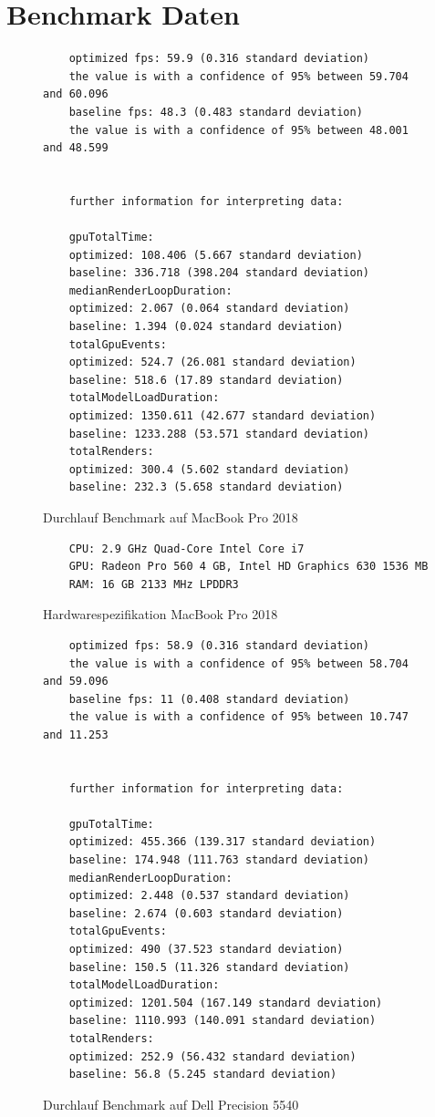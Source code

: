 \section{Benchmark Daten}
\begin{figure}[H]
  \begin{lstlisting}
    optimized fps: 59.9 (0.316 standard deviation)
    the value is with a confidence of 95% between 59.704 and 60.096
    baseline fps: 48.3 (0.483 standard deviation)
    the value is with a confidence of 95% between 48.001 and 48.599


    further information for interpreting data:

    gpuTotalTime:
    optimized: 108.406 (5.667 standard deviation)
    baseline: 336.718 (398.204 standard deviation)
    medianRenderLoopDuration:
    optimized: 2.067 (0.064 standard deviation)
    baseline: 1.394 (0.024 standard deviation)
    totalGpuEvents:
    optimized: 524.7 (26.081 standard deviation)
    baseline: 518.6 (17.89 standard deviation)
    totalModelLoadDuration:
    optimized: 1350.611 (42.677 standard deviation)
    baseline: 1233.288 (53.571 standard deviation)
    totalRenders:
    optimized: 300.4 (5.602 standard deviation)
    baseline: 232.3 (5.658 standard deviation)
  \end{lstlisting}
\caption{Durchlauf Benchmark auf MacBook Pro 2018}
\label{fig:benchmarkRun}
\end{figure}

\begin{figure}[H]
  \begin{lstlisting}
    CPU: 2.9 GHz Quad-Core Intel Core i7
    GPU: Radeon Pro 560 4 GB, Intel HD Graphics 630 1536 MB
    RAM: 16 GB 2133 MHz LPDDR3
  \end{lstlisting}
\caption{Hardwarespezifikation MacBook Pro 2018}
\label{fig:marcbookProSpecification}
\end{figure}

\begin{figure}[H]
  \begin{lstlisting}
    optimized fps: 58.9 (0.316 standard deviation)
    the value is with a confidence of 95% between 58.704 and 59.096
    baseline fps: 11 (0.408 standard deviation)
    the value is with a confidence of 95% between 10.747 and 11.253


    further information for interpreting data:

    gpuTotalTime:
    optimized: 455.366 (139.317 standard deviation)
    baseline: 174.948 (111.763 standard deviation)
    medianRenderLoopDuration:
    optimized: 2.448 (0.537 standard deviation)
    baseline: 2.674 (0.603 standard deviation)
    totalGpuEvents:
    optimized: 490 (37.523 standard deviation)
    baseline: 150.5 (11.326 standard deviation)
    totalModelLoadDuration:
    optimized: 1201.504 (167.149 standard deviation)
    baseline: 1110.993 (140.091 standard deviation)
    totalRenders:
    optimized: 252.9 (56.432 standard deviation)
    baseline: 56.8 (5.245 standard deviation)
  \end{lstlisting}
\caption{Durchlauf Benchmark auf Dell Precision 5540}
\label{fig:windowsBenchmarkRun}
\end{figure}

